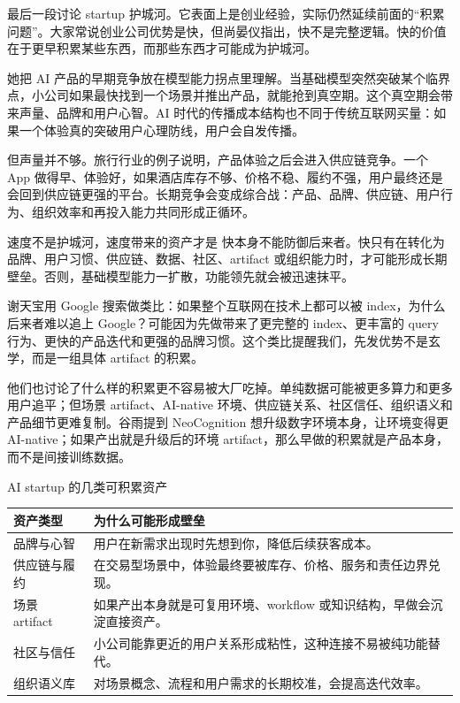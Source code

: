 \documentclass[a4paper]{article}
\begin{document}
最后一段讨论 startup 护城河。它表面上是创业经验，实际仍然延续前面的“积累问题”。大家常说创业公司优势是快，但尚晏仪指出，快不是完整逻辑。快的价值在于更早积累某些东西，而那些东西才可能成为护城河。

她把 AI 产品的早期竞争放在模型能力拐点里理解。当基础模型突然突破某个临界点，小公司如果最快找到一个场景并推出产品，就能抢到真空期。这个真空期会带来声量、品牌和用户心智。AI 时代的传播成本结构也不同于传统互联网买量：如果一个体验真的突破用户心理防线，用户会自发传播。

但声量并不够。旅行行业的例子说明，产品体验之后会进入供应链竞争。一个 App 做得早、体验好，如果酒店库存不够、价格不稳、履约不强，用户最终还是会回到供应链更强的平台。长期竞争会变成综合战：产品、品牌、供应链、用户行为、组织效率和再投入能力共同形成正循环。

\begin{importantbox}{速度不是护城河，速度带来的资产才是}
快本身不能防御后来者。快只有在转化为品牌、用户习惯、供应链、数据、社区、artifact 或组织能力时，才可能形成长期壁垒。否则，基础模型能力一扩散，功能领先就会被迅速抹平。
\end{importantbox}

谢天宝用 Google 搜索做类比：如果整个互联网在技术上都可以被 index，为什么后来者难以追上 Google？可能因为先做带来了更完整的 index、更丰富的 query 行为、更快的产品迭代和更强的品牌习惯。这个类比提醒我们，先发优势不是玄学，而是一组具体 artifact 的积累。

他们也讨论了什么样的积累更不容易被大厂吃掉。单纯数据可能被更多算力和更多用户追平；但场景 artifact、AI-native 环境、供应链关系、社区信任、组织语义和产品细节更难复制。谷雨提到 NeoCognition 想升级数字环境本身，让环境变得更 AI-native；如果产出就是升级后的环境 artifact，那么早做的积累就是产品本身，而不是间接训练数据。

\begin{knowledgebox}{AI startup 的几类可积累资产}
\begin{tabularx}{\textwidth}{>{\raggedright\arraybackslash}p{} Y}
\toprule
资产类型 & 为什么可能形成壁垒 \\
\midrule
品牌与心智 & 用户在新需求出现时先想到你，降低后续获客成本。 \\
供应链与履约 & 在交易型场景中，体验最终要被库存、价格、服务和责任边界兑现。 \\
场景 artifact & 如果产出本身就是可复用环境、workflow 或知识结构，早做会沉淀直接资产。 \\
社区与信任 & 小公司能靠更近的用户关系形成粘性，这种连接不易被纯功能替代。 \\
组织语义库 & 对场景概念、流程和用户需求的长期校准，会提高迭代效率。 \\
\bottomrule
\end{tabularx}
\end{knowledgebox}
\end{document}
